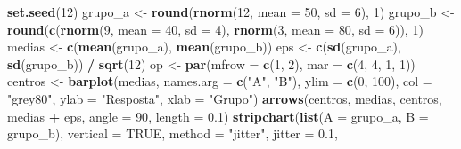 \documentclass[
]{book}
\newenvironment{Shaded}{\begin{snugshade}}{\end{snugshade}}
\newcommand{\AttributeTok}[1]{\textcolor[rgb]{0.13,0.29,0.53}{#1}}
\newcommand{\ConstantTok}[1]{\textcolor[rgb]{0.56,0.35,0.01}{#1}}
\newcommand{\DecValTok}[1]{\textcolor[rgb]{0.00,0.00,0.81}{#1}}
\newcommand{\FloatTok}[1]{\textcolor[rgb]{0.00,0.00,0.81}{#1}}
\newcommand{\FunctionTok}[1]{\textcolor[rgb]{0.13,0.29,0.53}{\textbf{#1}}}
\newcommand{\NormalTok}[1]{#1}
\newcommand{\OtherTok}[1]{\textcolor[rgb]{0.56,0.35,0.01}{#1}}
\newcommand{\SpecialCharTok}[1]{\textcolor[rgb]{0.81,0.36,0.00}{\textbf{#1}}}
\newcommand{\StringTok}[1]{\textcolor[rgb]{0.31,0.60,0.02}{#1}}
\begin{document}
\begin{Shaded}
\begin{Highlighting}[]
\FunctionTok{set.seed}\NormalTok{(}\DecValTok{12}\NormalTok{)}
\NormalTok{grupo\_a }\OtherTok{\textless{}{-}} \FunctionTok{round}\NormalTok{(}\FunctionTok{rnorm}\NormalTok{(}\DecValTok{12}\NormalTok{, }\AttributeTok{mean =} \DecValTok{50}\NormalTok{, }\AttributeTok{sd =} \DecValTok{6}\NormalTok{), }\DecValTok{1}\NormalTok{)}
\NormalTok{grupo\_b }\OtherTok{\textless{}{-}} \FunctionTok{round}\NormalTok{(}\FunctionTok{c}\NormalTok{(}\FunctionTok{rnorm}\NormalTok{(}\DecValTok{9}\NormalTok{, }\AttributeTok{mean =} \DecValTok{40}\NormalTok{, }\AttributeTok{sd =} \DecValTok{4}\NormalTok{), }\FunctionTok{rnorm}\NormalTok{(}\DecValTok{3}\NormalTok{, }\AttributeTok{mean =} \DecValTok{80}\NormalTok{, }\AttributeTok{sd =} \DecValTok{6}\NormalTok{)), }\DecValTok{1}\NormalTok{)}
\NormalTok{medias }\OtherTok{\textless{}{-}} \FunctionTok{c}\NormalTok{(}\FunctionTok{mean}\NormalTok{(grupo\_a), }\FunctionTok{mean}\NormalTok{(grupo\_b))}
\NormalTok{eps }\OtherTok{\textless{}{-}} \FunctionTok{c}\NormalTok{(}\FunctionTok{sd}\NormalTok{(grupo\_a), }\FunctionTok{sd}\NormalTok{(grupo\_b)) }\SpecialCharTok{/} \FunctionTok{sqrt}\NormalTok{(}\DecValTok{12}\NormalTok{)}
\NormalTok{op }\OtherTok{\textless{}{-}} \FunctionTok{par}\NormalTok{(}\AttributeTok{mfrow =} \FunctionTok{c}\NormalTok{(}\DecValTok{1}\NormalTok{, }\DecValTok{2}\NormalTok{), }\AttributeTok{mar =} \FunctionTok{c}\NormalTok{(}\DecValTok{4}\NormalTok{, }\DecValTok{4}\NormalTok{, }\DecValTok{1}\NormalTok{, }\DecValTok{1}\NormalTok{))}
\NormalTok{centros }\OtherTok{\textless{}{-}} \FunctionTok{barplot}\NormalTok{(medias, }\AttributeTok{names.arg =} \FunctionTok{c}\NormalTok{(}\StringTok{"A"}\NormalTok{, }\StringTok{"B"}\NormalTok{), }\AttributeTok{ylim =} \FunctionTok{c}\NormalTok{(}\DecValTok{0}\NormalTok{, }\DecValTok{100}\NormalTok{), }\AttributeTok{col =} \StringTok{"grey80"}\NormalTok{,}
                   \AttributeTok{ylab =} \StringTok{"Resposta"}\NormalTok{, }\AttributeTok{xlab =} \StringTok{"Grupo"}\NormalTok{)}
\FunctionTok{arrows}\NormalTok{(centros, medias, centros, medias }\SpecialCharTok{+}\NormalTok{ eps, }\AttributeTok{angle =} \DecValTok{90}\NormalTok{, }\AttributeTok{length =} \FloatTok{0.1}\NormalTok{)}
\FunctionTok{stripchart}\NormalTok{(}\FunctionTok{list}\NormalTok{(}\AttributeTok{A =}\NormalTok{ grupo\_a, }\AttributeTok{B =}\NormalTok{ grupo\_b), }\AttributeTok{vertical =} \ConstantTok{TRUE}\NormalTok{, }\AttributeTok{method =} \StringTok{"jitter"}\NormalTok{, }\AttributeTok{jitter =} \FloatTok{0.1}\NormalTok{,}

\end{Highlighting}
\end{Shaded}
\end{document}
